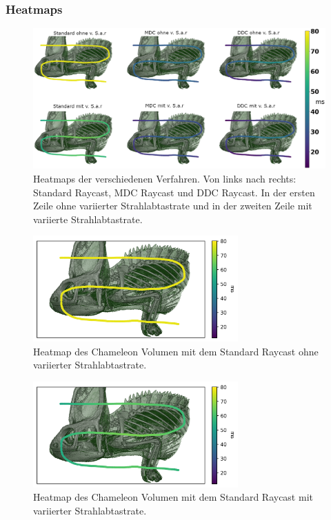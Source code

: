 \subsubsection{Heatmaps}
\begin{figure}
	\centering
	\includegraphics[width=1\textwidth]{../../Neue_Messungen/Chameleon/heatmaps/hm_wa.png}
	\caption{Heatmaps der verschiedenen Verfahren. Von links nach rechts: Standard Raycast, MDC Raycast und DDC Raycast. In der ersten Zeile ohne variierter Strahlabtastrate und in der zweiten Zeile mit variierte Strahlabtastrate.}
	\label{fig::res::pf::hm_wa}
\end{figure}

\iffalse
\begin{figure}
	\centering
	\includegraphics[width=0.7\textwidth]{../../Neue_Messungen/Chameleon/heatmaps/ms_data_st_chameleon_heatmap.png}
	\caption{Heatmap des Chameleon Volumen mit dem Standard Raycast ohne variierter Strahlabtastrate.}
	\label{fig::res::pf::hm_st}
\end{figure}

\begin{figure}
	\centering
	\includegraphics[width=0.7\textwidth]{../../Neue_Messungen/Chameleon/heatmaps/ms_data_st_rORS_chameleon_heatmap.png}
	\caption{Heatmap des Chameleon Volumen mit dem Standard Raycast mit variierter Strahlabtastrate.}
	\label{fig::res::pf::hm_st_ors}
\end{figure}

